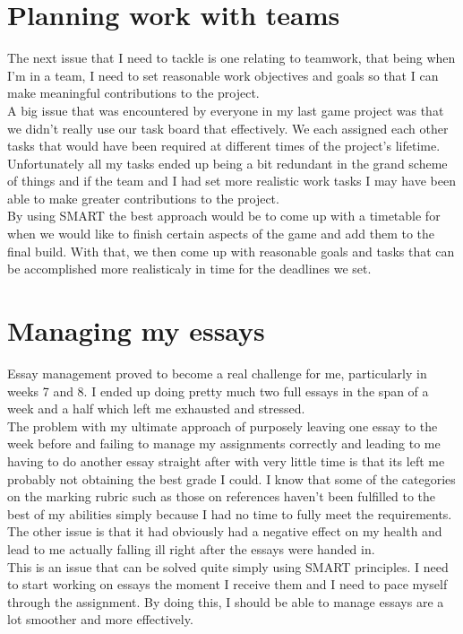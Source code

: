\documentclass{scrartcl}
\begin{document}
\section{Planning work with teams}

The next issue that I need to tackle is one relating to teamwork, that being when I'm in a team, I need to set reasonable work objectives and goals so that I can make meaningful contributions to the project.
\\
A big issue that was encountered by everyone in my last game project was that we didn't really use our task board that effectively. We each assigned each other tasks that would have been required at different times of the project's lifetime. Unfortunately all my tasks ended up being a bit redundant in the grand scheme of things and if the team and I had set more realistic work tasks I may have been able to make greater contributions to the project.
\\
By using SMART the best approach would be to come up with a timetable for when we would like to finish certain aspects of the game and add them to the final build. With that, we then come up with reasonable goals and tasks that can be accomplished more realisticaly in time for the deadlines we set.

\section{Managing my essays}

Essay management proved to become a real challenge for me, particularly in weeks 7 and 8. I ended up doing pretty much two full essays in the span of a week and a half which left me exhausted and stressed.
\\
The problem with my ultimate approach of purposely leaving one essay to the week before and failing to manage my assignments correctly and leading to me having to do another essay straight after with very little time is that its left me probably not obtaining the best grade I could. I know that some of the categories on the marking rubric such as those on references haven't been fulfilled to the best of my abilities simply because I had no time to fully meet the requirements. The other issue is that it had obviously had a negative effect on my health and lead to me actually falling ill right after the essays were handed in.
\\
This is an issue that can be solved quite simply using SMART principles. I need to start working on essays the moment I receive them and I need to pace myself through the assignment. By doing this, I should be able to manage essays are a lot smoother and more effectively.
\end{document}
